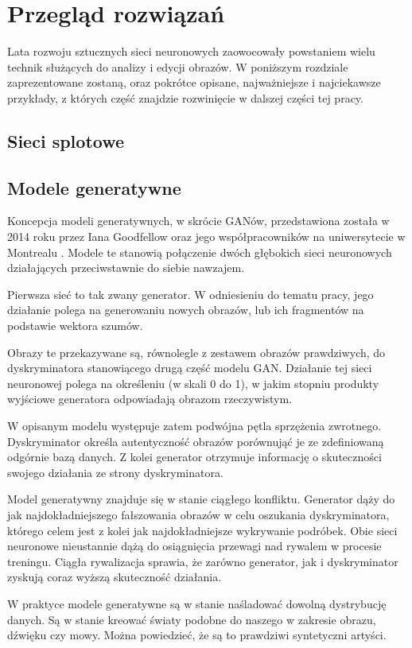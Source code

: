 \section{Przegląd rozwiązań}
  Lata rozwoju sztucznych sieci neuronowych zaowocowały powstaniem wielu technik służących do analizy i edycji obrazów. W poniższym rozdziale zaprezentowane zostaną, oraz pokrótce opisane, najważniejsze i najciekawsze przykłady, z których część znajdzie rozwinięcie w dalszej części tej pracy.

  \subsection{Sieci splotowe}


  \subsection{Modele generatywne}
  Koncepcja modeli generatywnych, w skrócie GANów, przedstawiona została w 2014 roku przez Iana Goodfellow oraz jego współpracowników na uniwersytecie w Montrealu \cite{gan}. Modele te stanowią połączenie dwóch głębokich sieci neuronowych działających przeciwstawnie do siebie nawzajem.

  Pierwsza sieć to tak zwany generator. W odniesieniu do tematu pracy, jego działanie polega na generowaniu nowych obrazów, lub ich fragmentów na podstawie wektora szumów.

  Obrazy te przekazywane są, równolegle z zestawem obrazów prawdziwych, do dyskryminatora stanowiącego drugą część modelu GAN. Działanie tej sieci neuronowej polega na określeniu (w skali 0 do 1), w jakim stopniu produkty wyjściowe generatora odpowiadają obrazom rzeczywistym.

  W opisanym modelu występuje zatem podwójna pętla sprzężenia zwrotnego. Dyskryminator określa autentyczność obrazów porównująć je ze zdefiniowaną odgórnie bazą danych. Z kolei generator otrzymuje informację o skuteczności swojego działania ze strony dyskryminatora.

  Model generatywny znajduje się w stanie ciągłego konfliktu. Generator dąży do jak najdokładniejszego fałszowania obrazów w celu oszukania dyskryminatora, którego celem jest z kolei jak najdokładniejsze wykrywanie podróbek. Obie sieci neuronowe nieustannie dążą do osiągnięcia przewagi nad rywalem w procesie treningu. Ciągła rywalizacja sprawia, że zarówno generator, jak i dyskryminator zyskują coraz wyższą skuteczność działania.

  W praktyce modele generatywne są w stanie naśladować dowolną dystrybucję danych. Są w stanie kreować światy podobne do naszego w zakresie obrazu, dźwięku czy mowy. Można powiedzieć, że są to prawdziwi syntetyczni artyści.
